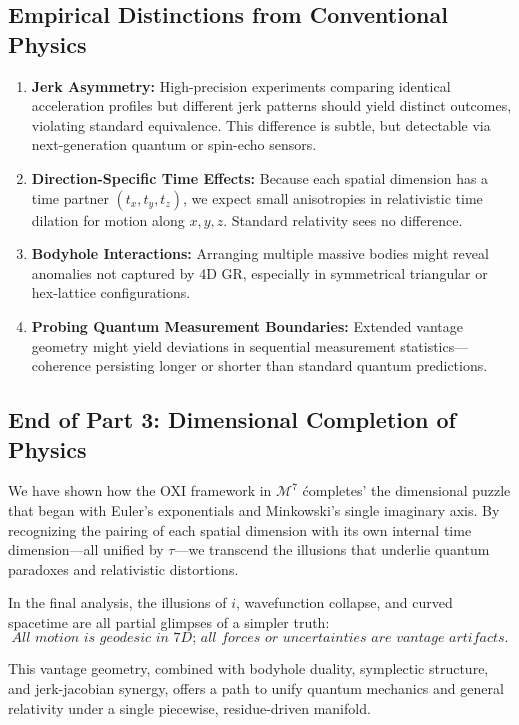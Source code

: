 \documentclass{article}
\begin{document}
\subsection*{Empirical Distinctions from Conventional Physics}
\begin{enumerate}
  \item \textbf{Jerk Asymmetry:} High-precision experiments comparing identical acceleration profiles but different jerk patterns should yield distinct outcomes, violating standard equivalence. This difference is subtle, but detectable via next-generation quantum or spin-echo sensors.
  \item \textbf{Direction-Specific Time Effects:} Because each spatial dimension has a time partner $(t_x, t_y, t_z)$, we expect small anisotropies in relativistic time dilation for motion along $x,y,z$. Standard relativity sees no difference.
  \item \textbf{Bodyhole Interactions:} Arranging multiple massive bodies might reveal anomalies not captured by 4D GR, especially in symmetrical triangular or hex-lattice configurations.
  \item \textbf{Probing Quantum Measurement Boundaries:} Extended vantage geometry might yield deviations in sequential measurement statistics—coherence persisting longer or shorter than standard quantum predictions.
\end{enumerate}

\subsection*{End of Part 3: Dimensional Completion of Physics}
We have shown how the OXI framework in $\mathcal{M}^7$ \'completes' the dimensional puzzle that began with Euler's exponentials and Minkowski’s single imaginary axis. By recognizing the pairing of each spatial dimension with its own internal time dimension---all unified by $\tau$---we transcend the illusions that underlie quantum paradoxes and relativistic distortions.

In the final analysis, the illusions of $i$, wavefunction collapse, and curved spacetime are all partial glimpses of a simpler truth: 
\[\textit{All motion is geodesic in 7D; all forces or uncertainties are vantage artifacts.}\]

This vantage geometry, combined with bodyhole duality, symplectic structure, and jerk-jacobian synergy, offers a path to unify quantum mechanics and general relativity under a single piecewise, residue-driven manifold. 
\end{document}
